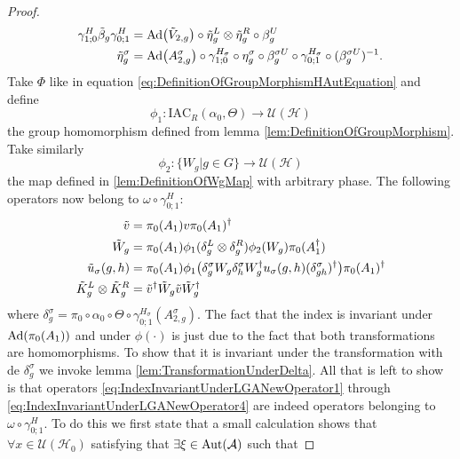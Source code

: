 \documentclass[12pt,a4paper,twoside]{article}
\let\originalleft\left
\let\originalright\right
\renewcommand{\left}{\mathopen{}\mathclose\bgroup\originalleft}
\renewcommand{\right}{\aftergroup\egroup\originalright}
\newcommand{\UU}{\mathcal U}
\newcommand{\HH}{\mathcal H}
\renewcommand{\AA}{\mathcal A}
\newcommand{\Ad}[1]{\textrm{Ad}\left(#1\right)}
\newcommand{\Aut}[1]{\textrm{Aut}\left(#1\right)}
\theoremstyle{definition}
\numberwithin{equation}{section}
\begin{document}
\begin{proof}
	\begin{align}
		\label{eq:IndexInvariantUnderLGAEtaTildeDefiniton1}
		\gamma^{H}_{1;0}\tilde{\beta}_g\gamma^{H}_{0;1}&=\Ad{\tilde V_{2,g}}\circ\tilde{\eta}_g^L\otimes\tilde{\eta}_g^R\circ\beta_g^U\\
		\label{eq:IndexInvariantUnderLGAEtaTildeDefiniton2}
		\tilde{\eta}_g^\sigma&=\Ad{A_{2,g}^\sigma}\circ\gamma^{H_\sigma}_{1;0}\circ\eta_g^\sigma\circ\beta_g^{\sigma U}\circ\gamma^{H_\sigma}_{0;1}\circ(\beta_g^{\sigma U})^{-1}.
	\end{align}
	Take $\Phi$ like in equation \eqref{eq:DefinitionOfGroupMorphismHAutEquation} and define
	\begin{equation}
		\phi_1:\textrm{IAC}_R(\alpha_0,\Theta) \rightarrow \UU(\HH)
	\end{equation}
	the group homomorphism defined from lemma \ref{lem:DefinitionOfGroupMorphism}. Take similarly
	\begin{equation}
		\phi_2:\{W_g|g\in G\}\rightarrow \UU(\HH)
	\end{equation}
	the map defined in \ref{lem:DefinitionOfWgMap} with arbitrary phase. The following operators now belong to $\omega\circ\gamma^{H}_{0;1}:$
	\begin{align}
		\label{eq:IndexInvariantUnderLGANewOperator1}
		\tilde{v}&=\pi_0(A_1)v\pi_0(A_1)^\dagger\\
		\label{eq:IndexInvariantUnderLGANewOperator2}
		\tilde{W}_g&=\pi_0(A_1)\phi_1(\delta^L_g\otimes\delta^R_g)\phi_2( W_g)\pi_0(A_1^\dagger)\\
		\label{eq:IndexInvariantUnderLGANewOperator3}
		\tilde u_\sigma(g,h)&=\pi_0(A_1) \phi_1\left(\delta^\sigma_g W_g\delta^\sigma_h W_g^\dagger u_\sigma(g,h)(\delta^\sigma_{gh})^\dagger\right)\pi_0(A_1)^\dagger\\
		\label{eq:IndexInvariantUnderLGANewOperator4}
		\tilde{K}_g^L\otimes \tilde{K}_g^R&=\tilde{v}^\dagger \tilde{W}_g\tilde{v}\tilde{W}_g^\dagger
	\end{align}
	where $\delta^\sigma_g=\pi_0\circ\alpha_0\circ\Theta\circ\gamma^{H_\sigma}_{0;1}(A^\sigma_{2,g}).$ The fact that the index is invariant under $\Ad{\pi_0(A_1)}$ and under $\phi(\cdot)$ is just due to the fact that both transformations are homomorphisms. To show that it is invariant under the transformation with de $\delta^\sigma_g$ we invoke lemma \ref{lem:TransformationUnderDelta}. All that is left to show is that operators \eqref{eq:IndexInvariantUnderLGANewOperator1} through \eqref{eq:IndexInvariantUnderLGANewOperator4} are indeed operators belonging to $\omega\circ\gamma^{H}_{0;1}$. To do this we first state that a small calculation shows that $\forall x\in\UU(\HH_0)$ satisfying that $\exists\xi\in\Aut{\AA}$ such that

\end{proof}
\end{document}
